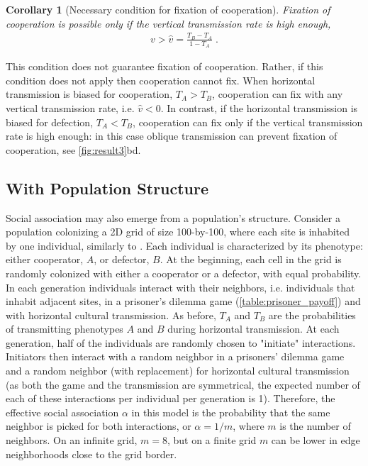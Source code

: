 \documentclass[12pt]{extarticle}
\newtheorem{corollary}{Corollary}
\begin{document}
{\begin{corollary}[Necessary condition for fixation of cooperation]
\label{corollary:vhat}
  Fixation of cooperation is possible only if the vertical transmission rate is high enough,
  \begin{equation} \label{eq:fixation_of_cooperation_vertical_transmission_condition}
    \begin{aligned}
      v>\hat{v} = \frac{T_B - T_A}{1-T_A} \;.
    \end{aligned}
    \end{equation} 
\end{corollary}
This condition does not guarantee fixation of cooperation. Rather, if this condition does not apply then cooperation cannot fix.
When horizontal transmission is biased for cooperation, $T_A>T_B$, cooperation can fix with any vertical transmission rate, i.e. $\hat{v}<0$.
In contrast, if the horizontal transmission is biased for defection, $T_A<T_B$,  cooperation can fix only if the vertical transmission rate is high enough: in this case oblique transmission can prevent fixation of cooperation, see \autoref{fig:result3}bd.
\\


\subsection*{With Population Structure}

Social association may also emerge from a population's structure.
Consider a  population colonizing a 2D grid of size 100-by-100, where each site is inhabited by one individual, similarly to \citet{lewin2020rockpaperscissors}.
Each individual is characterized by its phenotype: either cooperator, $A$, or defector, $B$.
At the beginning, each cell in the grid is randomly colonized with either a cooperator or a defector, with equal probability.
In each generation individuals interact with their neighbors, i.e. individuals that inhabit adjacent sites, in a prisoner's dilemma game (\autoref{table:prisoner_payoff}) and with horizontal cultural transmission.
As before, $T_A$ and $T_B$ are the probabilities of transmitting phenotypes $A$ and $B$ during horizontal transmission.
At each generation, half of the individuals are randomly chosen to "initiate" interactions.
Initiators then interact with a random neighbor in a prisoners' dilemma game and a random neighbor (with replacement) for horizontal cultural transmission (as both the game and the transmission are symmetrical, the expected number of each of these interactions per individual per generation is 1).
Therefore, the effective social association $\alpha$ in this model is the probability that the same neighbor is picked for both interactions, or $\alpha=1/m$, where $m$ is the number of neighbors.
On an infinite grid, $m=8$, but on a finite grid $m$ can be lower in edge neighborhoods close to the grid border.

}
\end{document}
